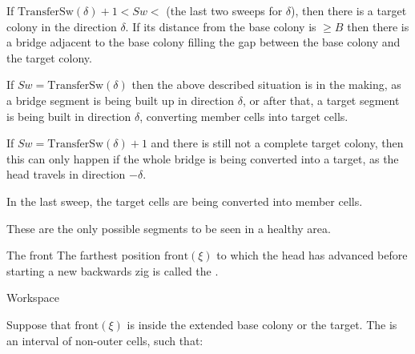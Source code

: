 \documentclass[12pt]{memoir}
\newcommand{\fld}[1]{\ensuremath{\textit{#1}}}
\def\B{B}
\newcommand{\pos}{\mathrm{pos}}
\newcommand{\Sweep}{\fld{Sw}}
\newcommand{\ZigDepth}{\fld{ZigDepth}}
\newcommand{\front}{\mathrm{front}}
\newcommand{\TransferSw}{\mathrm{TransferSw}}
\begin{document}
\begin{definition}
\begin{flushdescription}
\begin{bullets}
        \item If \( \TransferSw(\delta) +1 < \Sweep <  \) (the last two sweeps for \( \delta \)),
          then there is a target colony in the direction \( \delta \).
          If its distance from the base colony is \( \ge\B \) then there is a 
          bridge adjacent to the base colony filling the gap between the 
          base colony and the target colony.

        \item If \( \Sweep = \TransferSw(\delta) \) then the above 
          described situation is in the making, as
          a bridge segment is being built up in direction \( \delta \), or after that,
          a target segment is being built in direction \( \delta \), converting member cells into target cells.
          
        \item If \( \Sweep = \TransferSw(\delta) +1 \) and there is still not a complete target colony,
          then this can only happen if the whole bridge is being converted into a target, 
          as the head travels in direction \( -\delta \).

         \item In the last sweep, the target cells are being converted into member cells.
        \end{bullets}
        These are the only possible segments to be seen in a healthy area.
        
    \item [The front] 
    The farthest position \( \front(\xi) \) to which the head has 
    advanced before starting a new backwards zig is called the .

     \item[Workspace]

       \begin{sloppypar}
          Suppose that \( \front(\xi) \) is inside the extended base colony or the target.
          The  is an interval of non-outer cells, such that:         
       \end{sloppypar}


\end{flushdescription}
\end{definition}
\end{document}
